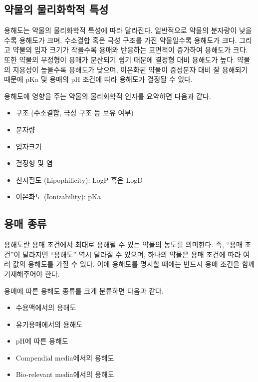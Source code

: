 \documentclass[
  11pt,
  krantz2, a4paper, twoside]{krantz}
\providecommand{\tightlist}{%
  \setlength{\itemsep}{0pt}\setlength{\parskip}{0pt}}
\begin{document}
\hypertarget{uxc57duxbb3cuxc758-uxbb3cuxb9acuxd654uxd559uxc801-uxd2b9uxc131}{%
\subsection{약물의 물리화학적 특성}\label{uxc57duxbb3cuxc758-uxbb3cuxb9acuxd654uxd559uxc801-uxd2b9uxc131}}

용해도는 약물의 물리화학적 특성에 따라 달라진다. 일반적으로 약물의 분자량이 낮을수록 용해도가 크며, 수소결합 혹은 극성 구조를 가진 약물일수록 용해도가 크다.
그리고 약물의 입자 크기가 작을수록 용매와 반응하는 표면적이 증가하여 용해도가 크다.
또한 약물의 무정형이 용매가 분산되기 쉽기 때문에 결정형 대비 용해도가 높다.
약물의 지용성이 높을수록 용해도가 낮으며, 이온화된 약물이 중성분자 대비 잘 용해되기 때문에 pKa 및 용매의 pH 조건에 따라 용해도가 결정될 수 있다.

용해도에 영향을 주는 약물의 물리화학적 인자를 요약하면 다음과 같다.

\begin{itemize}
\tightlist
\item
  구조 (수소결합, 극성 구조 등 보유 여부)
\item
  분자량
\item
  입자크기
\item
  결정형 및 염
\item
  친지질도 (Lipophilicity): LogP 혹은 LogD
\item
  이온화도 (Ionizability): pKa
\end{itemize}

\hypertarget{uxc6a9uxb9e4-uxc885uxb958}{%
\subsection{용매 종류}\label{uxc6a9uxb9e4-uxc885uxb958}}

용해도란 용매 조건에서 최대로 용해될 수 있는 약물의 농도를 의미한다.
즉, ``용매 조건''이 달라지면 ``용해도'' 역시 달라질 수 있으며, 하나의 약물은 용매 조건에 따라 여러 값의 용해도를 가질 수 있다.
이에 용해도를 명시할 때에는 반드시 용매 조건을 함께 기재해주어야 한다.

용매에 따른 용해도 종류를 크게 분류하면 다음과 같다.

\begin{itemize}
\tightlist
\item
  수용액에서의 용해도
\item
  유기용매에서의 용해도
\item
  pH에 따른 용해도
\item
  Compendial media에서의 용해도
\item
  Bio-relevant media에서의 용해도
\end{itemize}
\end{document}
